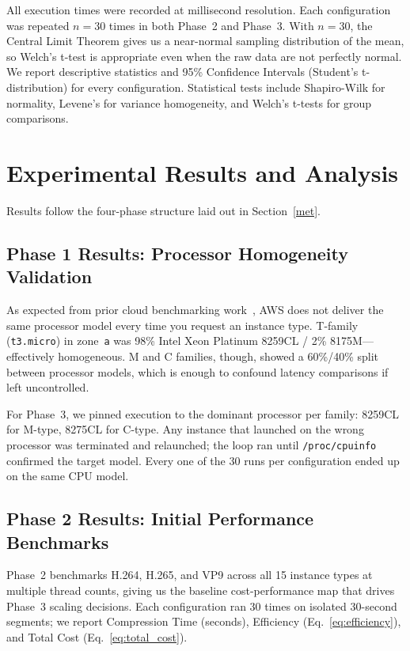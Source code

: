 \documentclass[conference]{IEEEtran}
\begin{document}
All execution times were recorded at millisecond resolution. Each configuration was repeated $n=30$ times in both Phase~2 and Phase~3. With $n=30$, the Central Limit Theorem gives us a near-normal sampling distribution of the mean, so Welch's t-test is appropriate even when the raw data are not perfectly normal. We report descriptive statistics and 95\% Confidence Intervals (Student's t-distribution) for every configuration. Statistical tests include Shapiro-Wilk for normality, Levene's for variance homogeneity, and Welch's t-tests for group comparisons.

\section{Experimental Results and Analysis}
\label{experiments}

Results follow the four-phase structure laid out in Section~\ref{met}.

\subsection{Phase 1 Results: Processor Homogeneity Validation}

As expected from prior cloud benchmarking work~\cite{b5, b6}, AWS does not deliver the same processor model every time you request an instance type. T-family (\texttt{t3.micro}) in zone~\texttt{a} was 98\% Intel Xeon Platinum 8259CL / 2\% 8175M---effectively homogeneous. M and C families, though, showed a 60\%/40\% split between processor models, which is enough to confound latency comparisons if left uncontrolled.

For Phase~3, we pinned execution to the dominant processor per family: 8259CL for M-type, 8275CL for C-type. Any instance that launched on the wrong processor was terminated and relaunched; the loop ran until \texttt{/proc/cpuinfo} confirmed the target model. Every one of the 30 runs per configuration ended up on the same CPU model.

\subsection{Phase 2 Results: Initial Performance Benchmarks}

Phase~2 benchmarks H.264, H.265, and VP9 across all 15 instance types at multiple thread counts, giving us the baseline cost-performance map that drives Phase~3 scaling decisions. Each configuration ran 30 times on isolated 30-second segments; we report Compression Time (seconds), Efficiency (Eq.~\ref{eq:efficiency}), and Total Cost (Eq.~\ref{eq:total_cost}).
\end{document}

